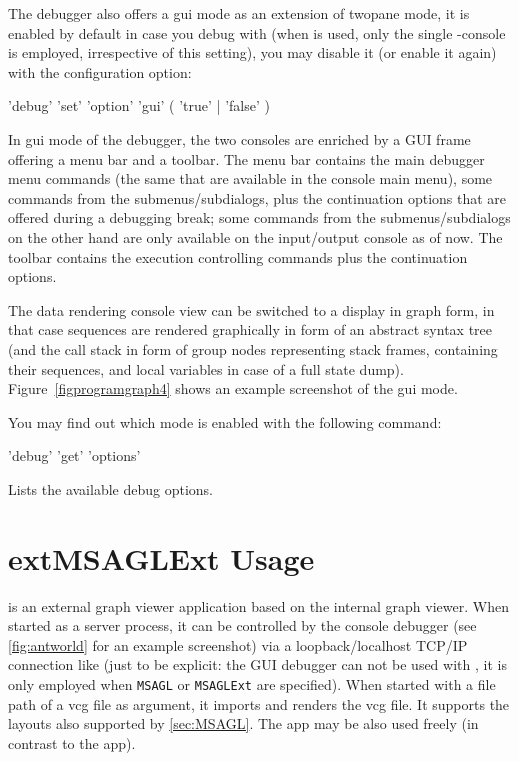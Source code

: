 The debugger also offers a gui mode as an extension of twopane mode, it is enabled by default in case you debug with \MSAGL{} (when \yComp{} is used, only the single \GrShell{}-console is employed, irrespective of this setting), you may disable it (or enable it again) with the configuration option:
\begin{rail}
  'debug' 'set' 'option' 'gui' ( 'true' | 'false' )
\end{rail}
In gui mode of the debugger, the two consoles are enriched by a GUI frame offering a menu bar and a toolbar.
The menu bar contains the main debugger menu commands (the same that are available in the console main menu), some commands from the submenus/subdialogs, plus the continuation options that are offered during a debugging break; some commands from the submenus/subdialogs on the other hand are only available on the input/output console as of now.
The toolbar contains the execution controlling commands plus the continuation options.

The data rendering console view can be switched to a display in graph form, in that case sequences are rendered graphically in form of an abstract syntax tree (and the call stack in form of group nodes representing stack frames, containing their sequences, and local variables in case of a full state dump).
Figure~\ref{figprogramgraph4} shows an example screenshot of the gui mode.

You may find out which mode is enabled with the following command:
\begin{rail}
  'debug' 'get' 'options'
\end{rail}
Lists the available debug options.


\section{extMSAGLExt Usage}\label{sec:extMSAGLExt}

\extMSAGLExt{} is an external graph viewer application based on the internal \MSAGLExt{} graph viewer.
When started as a server process, it can be controlled by the console debugger (see \ref{fig:antworld} for an example screenshot) via a loopback/localhost TCP/IP connection like \yComp{} (just to be explicit: the GUI debugger can not be used with \extMSAGLExt{}, it is only employed when \texttt{MSAGL} or \texttt{MSAGLExt} are specified).
When started with a file path of a vcg file as argument, it imports and renders the vcg file.
It supports the layouts also supported by \MSAGL{}\ref{sec:MSAGL}.
The \extMSAGLExt{} app may be also used freely (in contrast to the \yComp{} app).

